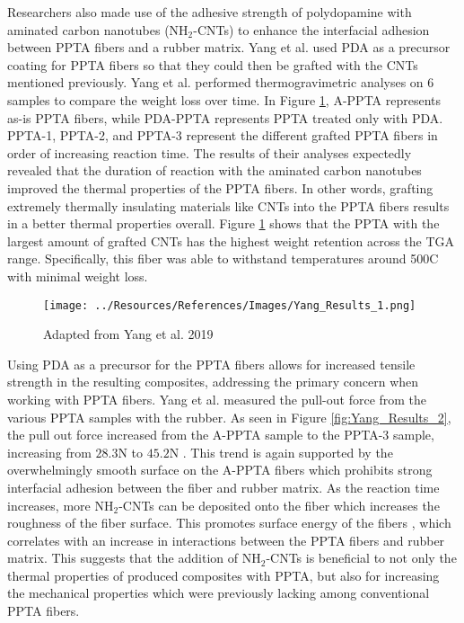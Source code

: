 \documentclass[12pt]{article}
\begin{document}
\begin{multicols}{2}
\indent Researchers also made use of the adhesive strength of polydopamine with aminated carbon nanotubes (NH$_2$-CNTs) to enhance the interfacial adhesion between PPTA fibers and a rubber matrix. Yang et al. \citep{Yang2019} used PDA as a precursor coating for PPTA fibers so that they could then be grafted with the CNTs mentioned previously.  Yang et al. \citep{Yang2019} performed thermogravimetric analyses on 6 samples to compare the weight loss over time. In Figure \ref{fig:Yang_Results_1}, A-PPTA represents as-is PPTA fibers, while PDA-PPTA represents PPTA treated only with PDA. PPTA-1, PPTA-2, and PPTA-3 represent the different grafted PPTA fibers in order of increasing reaction time. The results of their analyses expectedly revealed that the duration of reaction with the aminated carbon nanotubes improved the thermal properties of the PPTA fibers. In other words, grafting extremely thermally insulating materials like CNTs into the PPTA fibers results in a better thermal properties overall. Figure \ref{fig:Yang_Results_1} shows that the PPTA with the largest amount of grafted CNTs has the highest weight retention across the TGA range. Specifically, this fiber was able to withstand temperatures around 500\degree C with minimal weight loss. 

\begin{figure}[H]
    \centering
    \texttt{[image: ../Resources/References/Images/Yang\_Results\_1.png]}
    \caption{\scriptsize{Adapted from Yang et al. 2019 \citep{Yang2019}}}
    \label{fig:Yang_Results_1}
\end{figure}

\indent Using PDA as a precursor for the PPTA fibers allows for increased tensile strength in the resulting composites, addressing the primary concern when working with PPTA fibers. Yang et al. \citep{Yang2019} measured the pull-out force from the various PPTA samples with the rubber. As seen in Figure \ref{fig:Yang_Results_2}, the pull out force increased from the A-PPTA sample to the PPTA-3 sample, increasing from $28.3$N to $45.2$N \citep{Yang2019}. This trend is again supported by the overwhelmingly smooth surface on the A-PPTA fibers which prohibits strong interfacial adhesion between the fiber and rubber matrix. As the reaction time increases, more NH$_2$-CNTs can be deposited onto the fiber which increases the roughness of the fiber surface. This promotes surface energy of the fibers \citep{Yang2019}, which correlates with an increase in interactions between the PPTA fibers and rubber matrix. This suggests that the addition of NH$_2$-CNTs is beneficial to not only the thermal properties of produced composites with PPTA, but also for increasing the mechanical properties which were previously lacking among conventional PPTA fibers.


\end{multicols}
\end{document}
